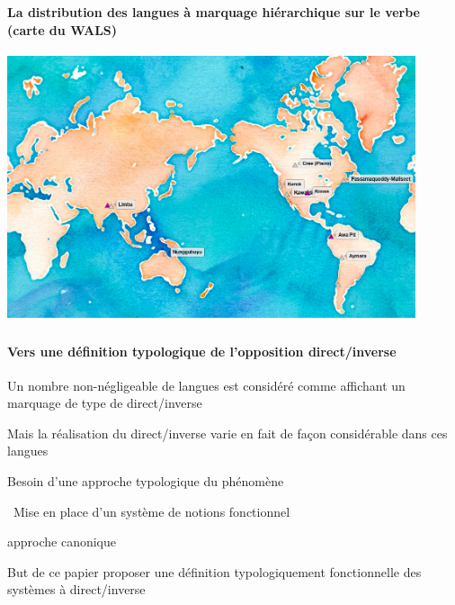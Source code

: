 \begin{frame}
\frametitle{}
\framesubtitle{La distribution des langues à marquage hiérarchique
  sur le verbe (carte du WALS)}
\begin{center}
\vspace*{-.3cm}
\includegraphics[width=120mm]{hierarchy-marking}

\end{center}
\end{frame}

\begin{frame}
\frametitle{}
\framesubtitle{Vers une définition typologique de l'opposition direct/inverse}
\begin{wideitemize}
\item Un nombre non-négligeable de langues est considéré comme affichant un marquage de
  type de direct/inverse
\item Mais la réalisation du direct/inverse varie en fait de façon
  considérable dans ces langues\\ 
\item[\highlighti{\lefthand}] Besoin d'une approche typologique du phénomène
\end{wideitemize}
\begin{wideitemize}
\item[\highlightiv{\lefthand}]~Mise en place d'un système de notions fonctionnel
\item[\highlightiv{\lefthand}] approche canonique
\end{wideitemize}
\begin{wideitemize}
\item[\highlightii{\lefthand}] But de ce papier {\ra} proposer une définition typologiquement
  fonctionnelle des systèmes à direct/inverse
\end{wideitemize}
\end{frame}